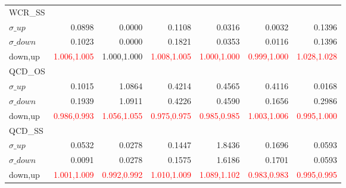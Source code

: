 \documentclass[11pt,oneside,a4paper]{article}
\begin{document}
\begin{table}
\begin{tabular}{lrrrrrr}
\hline
WCR\_SS &  &  &  &  &  &  \\
$\sigma\_up$ & 0.0898 & 0.0000 & 0.1108 & 0.0316 & 0.0032 & 0.1396 \\
$\sigma\_down$ & 0.1023 & 0.0000 & 0.1821 & 0.0353 & 0.0116 & 0.1396 \\
down,up & \textcolor{red}{1.006,1.005} & 1.000,1.000 & \textcolor{red}{1.008,1.005} & \textcolor{red}{1.000,1.000} & \textcolor{red}{0.999,1.000} & \textcolor{red}{1.028,1.028} \\

\hline
QCD\_OS &  &  &  &  &  &  \\
$\sigma\_up$ & 0.1015 & 1.0864 & 0.4214 & 0.4565 & 0.4116 & 0.0168 \\
$\sigma\_down$ & 0.1939 & 1.0911 & 0.4226 & 0.4590 & 0.1656 & 0.2986 \\
down,up & \textcolor{red}{0.986,0.993} & \textcolor{red}{1.056,1.055} & \textcolor{red}{0.975,0.975} & \textcolor{red}{0.985,0.985} & \textcolor{red}{1.003,1.006} & \textcolor{red}{0.995,1.000} \\

\hline
QCD\_SS &  &  &  &  &  &  \\
$\sigma\_up$ & 0.0532 & 0.0278 & 0.1447 & 1.8436 & 0.1696 & 0.0593 \\
$\sigma\_down$ & 0.0091 & 0.0278 & 0.1575 & 1.6186 & 0.1701 & 0.0593 \\
down,up & \textcolor{red}{1.001,1.009} & \textcolor{red}{0.992,0.992} & \textcolor{red}{1.010,1.009} & \textcolor{red}{1.089,1.102} & \textcolor{red}{0.983,0.983} & \textcolor{red}{0.995,0.995} \\

\hline
\end{tabular}
\end{table}
\end{document}
